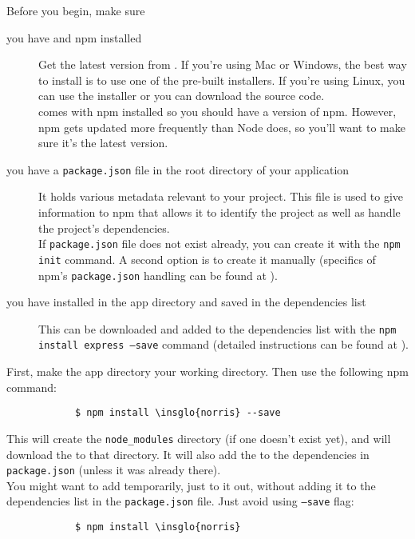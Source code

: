 		Before you begin, make sure
		\begin{description}
			\item[you have  and npm installed] Get the latest version from . If you're using Mac or Windows, the best way to install  is to use one of the pre-built installers. If you're using Linux, you can use the installer or you can download the source code.\\
			 comes with npm installed so you should have a version of npm. However, npm gets updated more frequently than Node does, so you'll want to make sure it's the latest version.
			\item[you have a \texttt{package.json} file in the root directory of your application] It holds various metadata relevant to your project. This file is used to give information to npm that allows it to identify the project as well as handle the project's dependencies.\\
			If \texttt{package.json} file does not exist already, you can create it with the \texttt{npm init} command. A second option is to create it manually (specifics of npm's \texttt{package.json} handling can be found at ).
			\item[you have  installed in the app directory and saved in the dependencies list] This  can be downloaded and added to the dependencies list with the \texttt{npm install express --save} command (detailed instructions can be found at ).
		\end{description}
		First, make the app directory your working directory. Then use the following npm command:
		\begin{lstlisting}
			$ npm install \insglo{norris} --save
		\end{lstlisting}
		This will create the \texttt{node\_modules} directory (if one doesn't exist yet), and will download the  to that directory. It will also add the  to the dependencies in \texttt{package.json} (unless it was already there).\\
		You might want to add  temporarily, just to it out, without adding it to the dependencies list in the \texttt{package.json} file. Just avoid using \texttt{--save} flag:
		\begin{lstlisting}
			$ npm install \insglo{norris}
		\end{lstlisting}